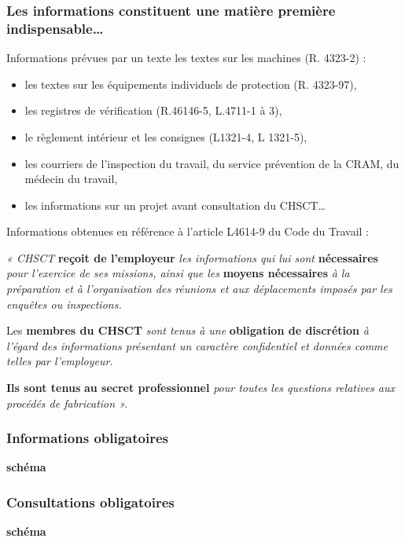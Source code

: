 \documentclass{beamer}
\begin{document}
\begin{frame}
\frametitle{Les informations constituent une matière première indispensable…}

Informations prévues par un texte 
les textes sur les machines (R. 4323-2) :
\begin{itemize}
\item les textes sur les équipements individuels de protection (R. 4323-97),

\item les registres de vérification (R.46146-5, L.4711-1 à 3),

\item le règlement intérieur et les consignes (L1321-4, L 1321-5),

\item les courriers de l’inspection du travail, du service prévention de la CRAM, du médecin du travail,

\item les informations sur un projet avant consultation du CHSCT…
\end{itemize}

Informations obtenues en référence à l’article L4614-9 du Code du Travail :

\textit{« CHSCT} \textbf{reçoit de l'employeur} \textit{les informations qui lui sont} \textbf{nécessaires} \textit{pour l'exercice de ses missions, ainsi que les} \textbf{moyens nécessaires} \textit{à la préparation et à l'organisation des réunions et aux déplacements imposés par les enquêtes ou inspections.} 

Les \textbf{membres du CHSCT} \textit{sont tenus à une} \textbf{obligation de discrétion} \textit{à l'égard des informations présentant un caractère confidentiel et données comme telles par l'employeur.} 

\textbf{Ils sont tenus} \textbf{au secret professionnel} \textit{pour toutes les questions relatives aux procédés de fabrication ».}
\end{frame}

\begin{frame}
\frametitle{Informations obligatoires}

\textbf{schéma}
\end{frame}


\begin{frame}
\frametitle{Consultations obligatoires}

\textbf{schéma}
\end{frame}
\end{document}
